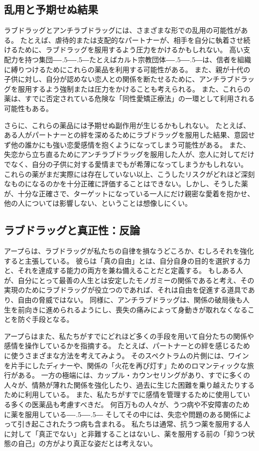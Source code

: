 \documentclass[paper=a4,book,openany]{jlreq}
\def\DDASH{―\kern-.5\zw―\kern-.5\zw―} %
\begin{document}
\subsection{乱用と予期せぬ結果}

ラブドラッグとアンチラブドラッグには、さまざまな形での乱用の可能性がある。
たとえば、虐待的または支配的なパートナーが、相手を自分に執着させ続けるために、ラブドラッグを服用するよう圧力をかけるかもしれない。
高い支配力を持つ集団{\DDASH}たとえばカルト宗教団体{\DDASH}は、信者を組織に縛りつけるためにこれらの薬品を利用する可能性がある。
また、親が十代の子供に対し、自分が認めない恋人との関係を断たせるために、アンチラブドラッグを服用するよう強制または圧力をかけることも考えられる。
また、これらの薬は、すでに否定されている危険な「同性愛矯正療法」の一環として利用される可能性もある。

さらに、これらの薬品には予期せぬ副作用が生じるかもしれない。
たとえば、ある人がパートナーとの絆を深めるためにラブドラッグを服用した結果、意図せず他の誰かにも強い恋愛感情を抱くようになってしまう可能性がある。
また、失恋から立ち直るためにアンチラブドラッグを服用した人が、恋人に対してだけでなく、自分の子供に対する愛情までもが希薄になってしまうかもしれない。
これらの薬がまだ実際には存在していない以上、こうしたリスクがどれほど深刻なものになるのかを十分正確に評価することはできない。しかし、そうした薬が、十分な正確さで、ターゲットになっている一人にだけ親密な愛着を抱かせ、他の人については影響しない、ということは想像しにくい。


\subsection{ラブドラッグと真正性：反論}

アープらは、ラブドラッグが私たちの自律を損なうどころか、むしろそれを強化すると主張している。
彼らは「真の自由」とは、自分自身の目的を選択する力と、それを達成する能力の両方を兼ね備えることだと定義する。
もしある人が、自分にとって最善の人生とは安定したモノガミーの関係であると考え、その実現のためにラブドラッグが役立つのであれば、それは自由を促進する道具であり、自由の脅威ではない。
同様に、アンチラブドラッグは、関係の破局後も人生を前向きに進められるようにし、喪失の痛みによって身動きが取れなくなることを防ぐ手段となる。

アープらはまた、私たちがすでにどれほど多くの手段を用いて自分たちの関係や感情を操作しているかを指摘する。
たとえば、パートナーとの絆を感じるために使うさまざまな方法を考えてみよう。
そのスペクトラムの片側には、ワインを片手にしたディナーや、関係の「火花を再び灯す」ためのロマンティックな旅行がある。
一方の極端には、カップル・カウンセリングがあり、すでに多くの人々が、情熱が薄れた関係を強化したり、過去に生じた困難を乗り越えたりするために利用している。
また、私たちがすでに感情を管理するために使用している多くの医薬品も考慮すべきだ。
何百万もの人々が、うつ病や不安障害のために薬を服用している{\DDASH}
そしてその中には、失恋や問題のある関係によって引き起こされたうつ病も含まれる。
私たちは通常、抗うつ薬を服用する人に対して「真正でない」と非難することはないし、薬を服用する前の「抑うつ状態の自己」の方がより真正な姿だとは考えない。
\end{document}
